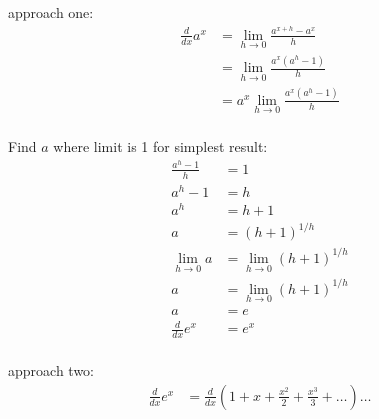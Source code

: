 \documentclass[letterpaper, landscape]{exam}
\begin{document}
  approach one:
  \begin{align*}
    \frac{d}{dx} a^x & = \lim_{h \to 0} \frac{a^{x + h} - a^x}{h} \\
                     & = \lim_{h \to 0} \frac{a^x \left( a^h - 1 \right)}{h} \\
                     & = a^x \lim_{h \to 0} \frac{a^x \left( a^h - 1 \right)}{h} \\
  \end{align*}

  Find $a$ where limit is 1 for simplest result:
  \begin{align*}
    \frac{a^h - 1}{h} & = 1 \\
    a^h - 1           & = h \\
    a^h               & = h + 1 \\
    a                 & = \left( h + 1 \right)^{1/h} \\
    \lim_{h \to 0} a  & = \lim_{h \to 0} \left( h + 1 \right)^{1/h} \\
    a                 & = \lim_{h \to 0} \left( h + 1 \right)^{1/h} \\
    a                 & = e \\
    \frac{d}{dx} e^x  & = e^x \\
  \end{align*}

  approach two:
  \begin{align*}
    \frac{d}{dx} e^x &= \frac{d}{dx} \left( 1 + x + \frac{x^2}{2} + \frac{x^3}{3} + \ldots  \right)
    \ldots
  \end{align*}
  
\end{document}

